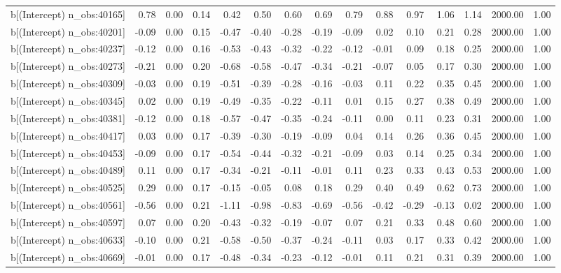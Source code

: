 \begin{table}[ht]
\begin{tabular}{rrrrrrrrrrrrrrr}
  b[(Intercept) n\_obs:40165] & 0.78 & 0.00 & 0.14 & 0.42 & 0.50 & 0.60 & 0.69 & 0.79 & 0.88 & 0.97 & 1.06 & 1.14 & 2000.00 & 1.00 \\ 
  b[(Intercept) n\_obs:40201] & -0.09 & 0.00 & 0.15 & -0.47 & -0.40 & -0.28 & -0.19 & -0.09 & 0.02 & 0.10 & 0.21 & 0.28 & 2000.00 & 1.00 \\ 
  b[(Intercept) n\_obs:40237] & -0.12 & 0.00 & 0.16 & -0.53 & -0.43 & -0.32 & -0.22 & -0.12 & -0.01 & 0.09 & 0.18 & 0.25 & 2000.00 & 1.00 \\ 
  b[(Intercept) n\_obs:40273] & -0.21 & 0.00 & 0.20 & -0.68 & -0.58 & -0.47 & -0.34 & -0.21 & -0.07 & 0.05 & 0.17 & 0.30 & 2000.00 & 1.00 \\ 
  b[(Intercept) n\_obs:40309] & -0.03 & 0.00 & 0.19 & -0.51 & -0.39 & -0.28 & -0.16 & -0.03 & 0.11 & 0.22 & 0.35 & 0.45 & 2000.00 & 1.00 \\ 
  b[(Intercept) n\_obs:40345] & 0.02 & 0.00 & 0.19 & -0.49 & -0.35 & -0.22 & -0.11 & 0.01 & 0.15 & 0.27 & 0.38 & 0.49 & 2000.00 & 1.00 \\ 
  b[(Intercept) n\_obs:40381] & -0.12 & 0.00 & 0.18 & -0.57 & -0.47 & -0.35 & -0.24 & -0.11 & 0.00 & 0.11 & 0.23 & 0.31 & 2000.00 & 1.00 \\ 
  b[(Intercept) n\_obs:40417] & 0.03 & 0.00 & 0.17 & -0.39 & -0.30 & -0.19 & -0.09 & 0.04 & 0.14 & 0.26 & 0.36 & 0.45 & 2000.00 & 1.00 \\ 
  b[(Intercept) n\_obs:40453] & -0.09 & 0.00 & 0.17 & -0.54 & -0.44 & -0.32 & -0.21 & -0.09 & 0.03 & 0.14 & 0.25 & 0.34 & 2000.00 & 1.00 \\ 
  b[(Intercept) n\_obs:40489] & 0.11 & 0.00 & 0.17 & -0.34 & -0.21 & -0.11 & -0.01 & 0.11 & 0.23 & 0.33 & 0.43 & 0.53 & 2000.00 & 1.00 \\ 
  b[(Intercept) n\_obs:40525] & 0.29 & 0.00 & 0.17 & -0.15 & -0.05 & 0.08 & 0.18 & 0.29 & 0.40 & 0.49 & 0.62 & 0.73 & 2000.00 & 1.00 \\ 
  b[(Intercept) n\_obs:40561] & -0.56 & 0.00 & 0.21 & -1.11 & -0.98 & -0.83 & -0.69 & -0.56 & -0.42 & -0.29 & -0.13 & 0.02 & 2000.00 & 1.00 \\ 
  b[(Intercept) n\_obs:40597] & 0.07 & 0.00 & 0.20 & -0.43 & -0.32 & -0.19 & -0.07 & 0.07 & 0.21 & 0.33 & 0.48 & 0.60 & 2000.00 & 1.00 \\ 
  b[(Intercept) n\_obs:40633] & -0.10 & 0.00 & 0.21 & -0.58 & -0.50 & -0.37 & -0.24 & -0.11 & 0.03 & 0.17 & 0.33 & 0.42 & 2000.00 & 1.00 \\ 
  b[(Intercept) n\_obs:40669] & -0.01 & 0.00 & 0.17 & -0.48 & -0.34 & -0.23 & -0.12 & -0.01 & 0.11 & 0.21 & 0.31 & 0.39 & 2000.00 & 1.00 \\ 

\end{tabular}
\end{table}
